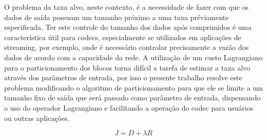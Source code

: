     O problema da taxa alvo, neste contexto, é a necessidade de fazer com que os dados de saída possuam um tamanho próximo a uma taxa préviamente
    especificada. Ter este controle do tamanho dos dados após comprimidos é uma característica útil para codecs, especialmente se utilizados em
    aplicações de streaming, por exemplo, onde é necessário controlar precisamente a vazão dos dados de acordo com a capacidade da rede. A utilização
    de um custo Lagrangiano para o particionamento dos blocos torna difícil a tarefa de estimar a taxa alvo através dos parâmetros de entrada, por isso
    o presente trabalho resolve este problema modificando o algoritmo de particionamento para que ele se limite a um tamanho fixo de saída que será 
    passado como parâmetro de entrada, dispensando o uso do operador Lagrangiano e facilitando a operação do codec para usuários ou outras aplicações.

\begin{equation}
    \label{eqn:lagrangian_cost}
    J = D + \lambda R
\end{equation}









